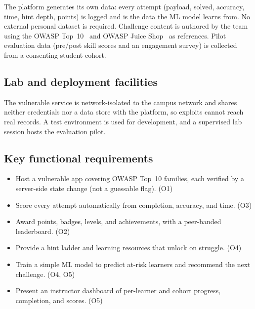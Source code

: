 The platform generates its own data: every attempt (payload, solved, accuracy, time,
hint depth, points) is logged and is the data the ML model learns from. No external
personal dataset is required. Challenge content is authored by the team using the
OWASP Top~10~\cite{Owasp2021top10} and OWASP Juice Shop~\cite{Owasp_juiceshop} as
references. Pilot evaluation data (pre/post skill scores and an engagement survey) is
collected from a consenting student cohort.

\subsection{Lab and deployment facilities}

The vulnerable service is network-isolated to the campus network and shares neither
credentials nor a data store with the platform, so exploits cannot reach real
records. A test environment is used for development, and a
supervised lab session hosts the evaluation pilot.

\subsection{Key functional requirements}

\begin{itemize}[leftmargin=1.4em,itemsep=0.2em]
\item Host a vulnerable app covering OWASP Top~10 families, each verified by a
      server-side state change (not a guessable flag). (O1)
\item Score every attempt automatically from completion, accuracy, and time. (O3)
\item Award points, badges, levels, and achievements, with a peer-banded
      leaderboard. (O2)
\item Provide a hint ladder and learning resources that unlock on struggle. (O4)
\item Train a simple ML model to predict at-risk learners and recommend the next
      challenge. (O4, O5)
\item Present an instructor dashboard of per-learner and cohort progress, completion,
      and scores. (O5)
\end{itemize}
